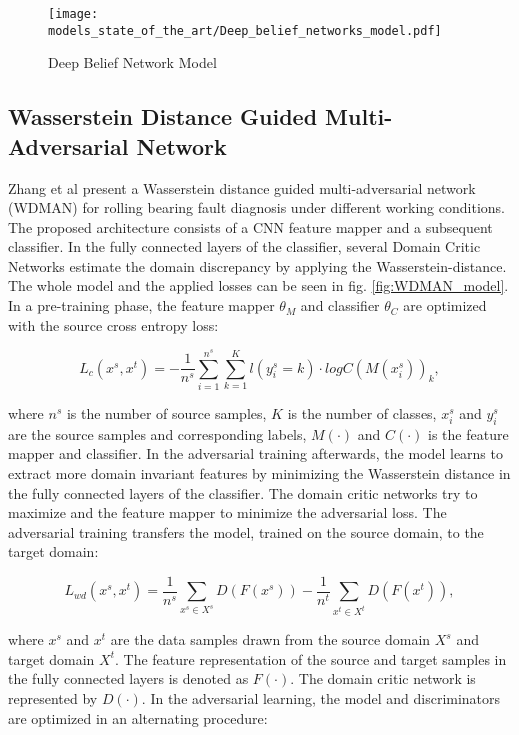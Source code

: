 \begin{figure}[H]
  \centering
  \texttt{[image: models\_state\_of\_the\_art/Deep\_belief\_networks\_model.pdf]}
  \caption{Deep Belief Network Model \cite{Zhang2017}}
  \label{fig:Deep_belief_networks_model}
\end{figure}


\subsection{Wasserstein Distance Guided Multi-Adversarial Network}
Zhang et al \cite{Zhang2019} present a Wasserstein distance guided multi-adversarial network (WDMAN) for rolling bearing fault diagnosis under different working conditions. The proposed architecture consists of a CNN feature mapper and a subsequent classifier. In the fully connected layers of the classifier, several Domain Critic Networks estimate the domain discrepancy by applying the Wasserstein-distance. The whole model and the applied losses can be seen in fig. \ref{fig:WDMAN_model}. In a pre-training phase, the feature mapper $\theta_{M}$ and classifier $\theta_{C}$ are optimized with the source cross entropy loss:
 
\begin{equation}
     L_{c}(x^{s}, x^{t}) = -\frac{1}{n^{s}} \sum_{i=1}^{n^{s}} \sum_{k=1}^{K} l(y_{i}^{s}=k) \cdot logC(M(x_{i}^{s}))_{k},
\end{equation}

where $n^{s}$ is the number of source samples, $K$ is the number of classes, $x_{i}^{s}$ and $y_{i}^{s}$ are the source samples and corresponding labels, $M(\cdot)$ and $C(\cdot)$ is the feature mapper and classifier. In the adversarial training afterwards, the model learns to extract more domain invariant features by minimizing the Wasserstein distance in the fully connected layers of the classifier. The domain critic networks try to maximize and the feature mapper to minimize the adversarial loss. The adversarial training transfers the model, trained on the source domain, to the target domain:
 
\begin{equation}
     L_{wd}(x^{s}, x^{t}) = \frac{1}{n^{s}} \sum_{x^{s} \in X^{s}} D(F(x^{s})) - \frac{1}{n^{t}} \sum_{x^{t} \in X^{t}} D(F(x^{t})),
\end{equation}

where $x^{s}$ and $x^{t}$ are the data samples drawn from the source domain $X^{s}$ and target domain $X^{t}$. The feature representation of the source and target samples in the fully connected layers is denoted as $F(\cdot)$. The domain critic network is represented by $D(\cdot)$. In the adversarial learning, the model and discriminators are optimized in an alternating procedure:

